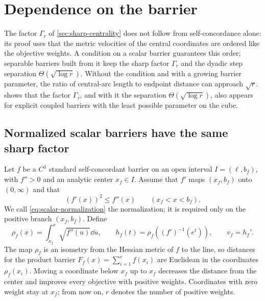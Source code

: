 \section{Dependence on the barrier}
\label{sec:barrier-dependence}
The factor $\Gamma_r$ of \cref{sec:sharp-centrality} does not follow
from self-concordance alone: its proof uses that the metric velocities
of the central coordinates are ordered like the objective weights. A
condition on a scalar barrier guarantees this order; separable barriers
built from it keep the sharp factor $\Gamma_r$ and the dyadic step
separation $\Theta(\sqrt{\log r})$. Without the condition and with a
growing barrier parameter, the ratio of central-arc length to endpoint
distance can approach $\sqrt r$.  shows that
the factor $\Gamma_r$, and with it the separation $\Theta(\sqrt{\log r})$,
also appears for explicit coupled barriers with the least possible
parameter on the cube.

\subsection{Normalized scalar barriers have the same sharp factor}
Let $f$ be a $C^3$ standard self-concordant barrier on an open interval
$I=(\ell,b_f)$, with $f''>0$ and an analytic center $x_f\in I$.
Assume that $f'$ maps $(x_f,b_f)$ onto $(0,\infty)$ and that
\begin{equation}
 (f'(x))^2\leq f''(x)\qquad(x_f<x<b_f).
 \label{eq:scalar-normalization}
\end{equation}
We call \eqref{eq:scalar-normalization} the normalization; it is
required only on the positive branch $(x_f,b_f)$. Define
\[
 \rho_f(x)=\int_{x_f}^x\sqrt{f''(u)}\dd u,\qquad
 h_f(t)=\rho_f((f')^{-1}(e^t)),\qquad v_f=h_f'.
\]
The map $\rho_f$ is an isometry from the Hessian metric of $f$ to the
line, so distances for the product barrier
$F_f(x)=\sum_{i=1}^r f(x_i)$ are Euclidean in the coordinates
$\rho_f(x_i)$. Moving a coordinate below $x_f$ up to $x_f$ decreases
the distance from the center and improves every objective with positive
weights. Coordinates with zero weight stay at $x_f$; from now on, $r$
denotes the number of positive weights.

